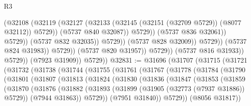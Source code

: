 \begin{lexlean}{R3}
\begin{coremodule}
                                                (@32108
                                                  (@32119
                                                    (@32127
                                                      (@32133
                                                        (@32145
                                                          (@32151 (@32709 @5729))
                                                          (@8077 @32112))
                                                        @5729))
                                                    (@5737 @840 @32087))
                                                  @5729))
                                              (@5737 @836 @32061))
                                            @5729))
                                        (@5737 @832 @32035))
                                      @5729))
                                  (@5737 @828 @32009))
                                @5729))
                            (@5737 @824 @31983))
                          @5729))
                      (@5737 @820 @31957))
                    @5729))
                (@5737 @816 @31933))
              @5729))
          (@7923 @31909))
        @5729))
@32831 := @31696
    (@31707
      (@31715
        (@31721
          (@31732
            (@31738
              (@31744
                (@31755
                  (@31761
                    (@31767
                      (@31778
                        (@31784
                          (@31790
                            (@31801
                              (@31807
                                (@31813
                                  (@31824
                                    (@31830
                                      (@31836
                                        (@31847
                                          (@31853
                                            (@31859
                                              (@31870
                                                (@31876
                                                  (@31882
                                                    (@31893
                                                      (@31899
                                                        (@31905 (@32773 (@7937 @31886)) @5729))
                                                      (@7944 @31863))
                                                    @5729))
                                                (@7951 @31840))
                                              @5729))
                                          (@8056 @31817))

\end{coremodule}
\end{lexlean}
